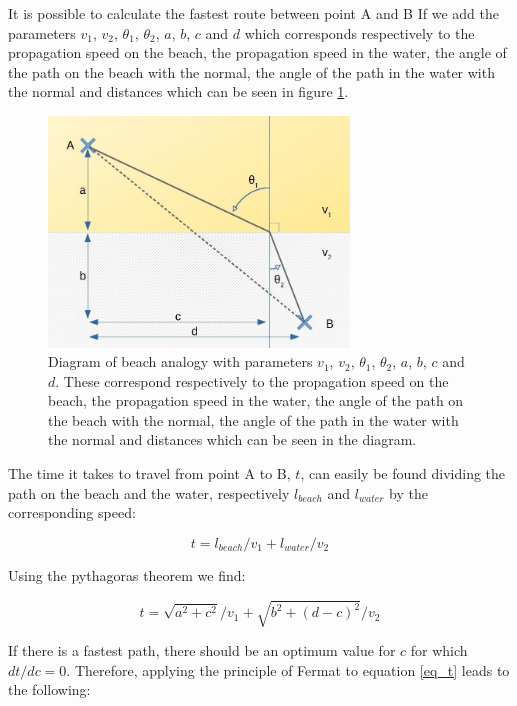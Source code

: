 It is possible to calculate the fastest route between point A and B If we add the parameters $v_1$, $v_2$, $\theta _1$, $\theta _2$, $a$, $b$, $c$ and $d$ which corresponds respectively to the propagation speed on the beach, the propagation speed in the water, the angle of the path on the beach with the normal, the angle of the path in the water with the normal and distances which can be seen in figure \ref{fig_snell_full}.

\begin{figure}[h!]
	\centering
	\includegraphics[width=8cm]{afbeeldingen/snell_diagram_vol.jpg}
	\caption{Diagram of beach analogy with parameters $v_1$, $v_2$, $\theta _1$, $\theta _2$, $a$, $b$, $c$ and $d$. These correspond respectively to the propagation speed on the beach, the propagation speed in the water, the angle of the path on the beach with the normal, the angle of the path in the water with the normal and distances which can be seen in the diagram.}
	\label{fig_snell_full}
\end{figure}

The time it takes to travel from point A to B, $t$, can easily be found dividing the path on the beach and the water, respectively $l_{beach}$ and $l_{water}$ by the corresponding speed:

\begin{equation*}
	t = l_{beach}/v_1 + l_{water}/v_2
\end{equation*}

Using the pythagoras theorem we find:

\begin{equation}
	t = \sqrt{a^2 + c^2}/v_1 + \sqrt{b^2 + (d-c)^2}/v_2
	\label{eq_t}
\end{equation}

If there is a fastest path, there should be an optimum value for $c$ for which $dt/dc = 0$. Therefore, applying the principle of Fermat to equation \ref{eq_t} leads to the following:

